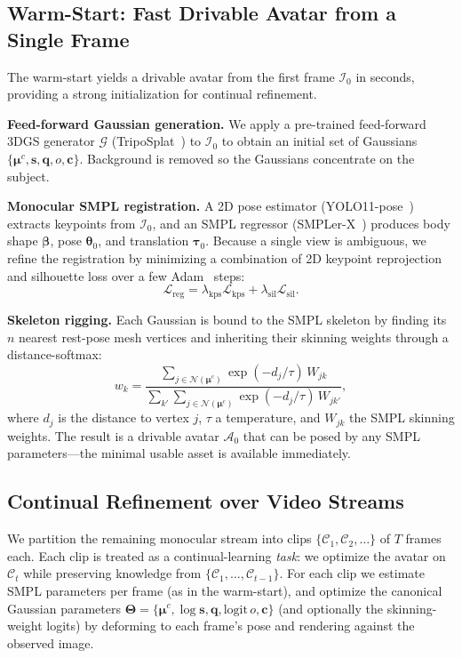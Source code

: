 \subsection{Warm-Start: Fast Drivable Avatar from a Single Frame}\label{sec:method:warmstart}
The warm-start yields a drivable avatar from the first frame
$\mathcal{I}_0$ in seconds, providing a strong initialization for
continual refinement.

\textbf{Feed-forward Gaussian generation.} We apply a pre-trained
feed-forward 3DGS generator $\mathcal{G}$ (TripoSplat~\cite{yan2026triposplat})
to $\mathcal{I}_0$ to obtain an initial set of Gaussians
$\{\bm{\mu}^{c}, \bm{s}, \bm{q}, o, \bm{c}\}$. Background is removed so the
Gaussians concentrate on the subject.

\textbf{Monocular SMPL registration.} A 2D pose estimator
(YOLO11-pose~\cite{ultralytics2023yolo}) extracts keypoints from
$\mathcal{I}_0$, and an SMPL regressor (SMPLer-X~\cite{cai2024smplerx})
produces body shape $\bm{\beta}$, pose $\bm{\theta}_0$, and translation
$\bm{\tau}_0$. Because a single view is ambiguous, we refine the
registration by minimizing a combination of 2D keypoint reprojection and
silhouette loss over a few Adam~\cite{kingma2014adam} steps:
\begin{equation}
  \mathcal{L}_{\mathrm{reg}} = \lambda_{\mathrm{kps}}\mathcal{L}_{\mathrm{kps}}
    + \lambda_{\mathrm{sil}}\mathcal{L}_{\mathrm{sil}}.
  \label{eq:reg}
\end{equation}

\textbf{Skeleton rigging.} Each Gaussian is bound to the SMPL skeleton by
finding its $n$ nearest rest-pose mesh vertices and inheriting their
skinning weights through a distance-softmax:
\begin{equation}
  w_k = \frac{\sum_{j\in\mathcal{N}(\bm{\mu}^{c})}\!\!\exp(-d_j/\tau)\,W_{jk}}
             {\sum_{k'}\sum_{j\in\mathcal{N}(\bm{\mu}^{c})}\!\!\exp(-d_j/\tau)\,W_{jk'}},
  \label{eq:rig}
\end{equation}
where $d_j$ is the distance to vertex $j$, $\tau$ a temperature, and
$W_{jk}$ the SMPL skinning weights. The result is a drivable
avatar $\mathcal{A}_0$ that can be posed by any SMPL parameters---the
minimal usable asset is available immediately.

\subsection{Continual Refinement over Video Streams}\label{sec:method:continual}
We partition the remaining monocular stream into clips
$\{\mathcal{C}_1, \mathcal{C}_2, \dots\}$ of $T$ frames each. Each clip is
treated as a continual-learning \emph{task}: we optimize the avatar on
$\mathcal{C}_t$ while preserving knowledge from
$\{\mathcal{C}_1,\dots,\mathcal{C}_{t-1}\}$. For each clip we estimate
SMPL parameters per frame (as in the warm-start), and optimize the
canonical Gaussian parameters $\bm{\Theta}=\{\bm{\mu}^{c},\log\bm{s},\bm{q},\mathrm{logit}\,o,\bm{c}\}$
(and optionally the skinning-weight logits) by deforming to each frame's
pose and rendering against the observed image.

